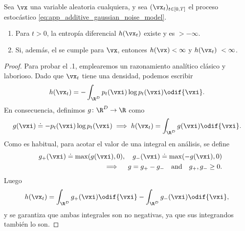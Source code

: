 \documentclass[../../book-main_es.tex]{subfiles}
\begin{document}
\begin{lemma}\label{lem:diffusion_entropy_exists}
    Sea \(\vx\) una variable aleatoria cualquiera, y sea \((\vx_{t})_{t \in
    [0, T]}\) el proceso estocástico
    \eqref{eq:app_additive_gaussian_noise_model}.
    \begin{enumerate}
        \item Para \(t > 0\), la entropía diferencial \(h(\vx_{t})\)
            existe y es \(> -\infty\).
        \item Si, además, el
             se cumple para
            \(\vx\), entonces \(h(\vx) < \infty\) y \(h(\vx_{t})\ < \infty\).
    \end{enumerate}
\end{lemma}
\begin{proof}
    Para probar el .1, emplearemos un razonamiento analítico clásico
    y laborioso. Dado que \(\vx_{t}\) tiene una densidad, podemos escribir
    \begin{equation}
        h(\vx_{t}) = -\int_{\R^{D}}p_{t}(\vxi)\log p_{t}(\vxi) \odif{\vxi}.
    \end{equation}
    En consecuencia, definimos \(g \colon \R^{D} \to \R\) como
    \begin{equation}
        g(\vxi) \doteq -p_{t}(\vxi)\log p_{t}(\vxi) \implies
        h(\vx_{t}) = \int_{\R^{D}}g(\vxi)\odif{\vxi}.
    \end{equation}
    Como es habitual, para acotar el valor de una integral en análisis, se define
    \begin{eqnarray}
        &&g_{+}(\vxi) \doteq \max(g(\vxi), 0), \quad g_{-}(\vxi) \doteq
        \max(-g(\vxi), 0) \\ && \implies \quad g = g_{+} - g_{-}\quad
        \text{and} \quad g_{+}, g_{-} \geq 0.
    \end{eqnarray}
    Luego
    \begin{equation}
        h(\vx_{t}) = \int_{\R^{D}}g_{+}(\vxi)\odif{\vxi} -
        \int_{\R^{D}}g_{-}(\vxi)\odif{\vxi},
    \end{equation}
    y se garantiza que ambas integrales son no negativas, ya que sus
    integrandos también lo son.


\end{proof}
\end{document}
